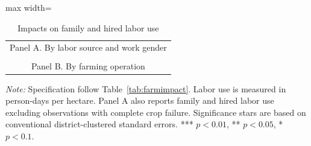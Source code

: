 \documentclass[11pt]{article}
\makeatletter
\newenvironment{panels}
  {\par\centering\begin{adjustbox}{max width=\linewidth}\scriptsize\begin{tabular}{@{}c@{}}}
  {\end{tabular}\end{adjustbox}\par}
\newcommand{\panel}[1]{\rule{0pt}{20pt}\small{#1}\\[6pt]}
\newcommand{\tnote}[1]{%
  \par\vspace{3pt}%
  \noindent\begin{minipage}{\linewidth}%
    \scriptsize\setlength{\parindent}{0pt}\textit{Note:} #1%
  \end{minipage}}
\makeatother
\begin{document}
\begin{table}
\caption{Impacts on family and hired labor use}
\label{tab:labour}
\begin{panels}
\panel{Panel A. By labor source and work gender}
\\[18pt]
\panel{Panel B. By farming operation}

\end{panels}
\tnote{Specification follow Table~\ref{tab:farmimpact}. Labor use is measured in person-days per hectare. Panel A also reports family and hired labor use excluding observations with complete crop failure. Significance stars are based on conventional district-clustered standard errors. *** $p<0.01$, ** $p<0.05$, * $p<0.1$.}
\end{table}
\end{document}
